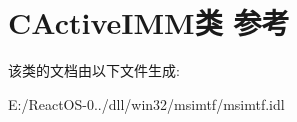 \hypertarget{class_c_active_i_m_m}{}\section{C\+Active\+I\+M\+M类 参考}
\label{class_c_active_i_m_m}


该类的文档由以下文件生成\+:\begin{DoxyCompactItemize}
\item 
E\+:/\+React\+O\+S-\/0../dll/win32/msimtf/msimtf.\+idl\end{DoxyCompactItemize}
